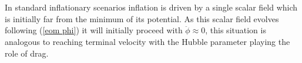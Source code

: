 \documentclass[letterpaper,11pt]{article}
\begin{document}
\section{}
In standard inflationary scenarios inflation is driven by a single scalar field which is initially far from the minimum of its potential. %
As this scalar field evolves following (\ref{eom phi}) it will initially proceed with $\ddot{\phi} \approx 0$, this situation is analogous to reaching terminal velocity with the Hubble parameter playing the role of drag.
\end{document}

